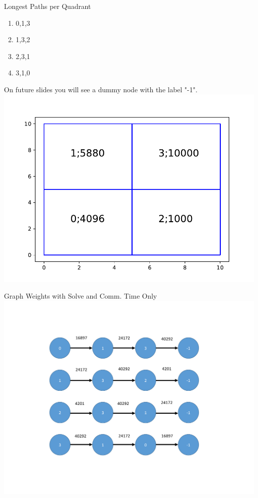\documentclass[xcolor={usenames,dvipsnames,svgnames,table}]{beamer}
\begin{document}
\begin{frame}[t]{Longest Paths per Quadrant}
\begin{block}{}
	\begin{enumerate}
		\item 0,1,3
		\item 1,3,2
		\item 2,3,1
		\item 3,1,0
	\end{enumerate}
\end{block}
On future slides you will see a dummy node with the label "-1".
\includegraphics[trim={1cm 0cm 1cm 1cm},clip,scale=0.4]{figures/2d_layer.pdf}
\end{frame}

\begin{frame}[t]{Graph Weights with Solve and Comm. Time Only}
\centering
\includegraphics[trim={2cm 2cm 4cm 2cm},clip,scale=0.45]{figures/solve_only.pdf}
\end{frame}
\end{document}

